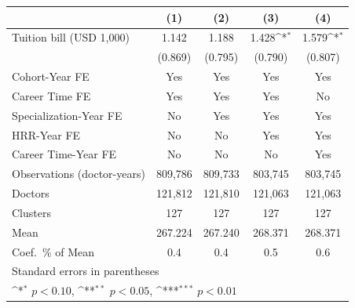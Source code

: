 {
\def\sym#1{\ifmmode^{#1}\else\(^{#1}\)\fi}
\begin{tabular}{l*{4}{c}}
\hline\hline
                    &\multicolumn{1}{c}{(1)}         &\multicolumn{1}{c}{(2)}         &\multicolumn{1}{c}{(3)}         &\multicolumn{1}{c}{(4)}         \\
\hline
Tuition bill (USD 1,000)&       1.142         &       1.188         &       1.428\sym{*}  &       1.579\sym{*}  \\
                    &     (0.869)         &     (0.795)         &     (0.790)         &     (0.807)         \\
[1em]
Cohort-Year FE      &         Yes         &         Yes         &         Yes         &         Yes         \\
[1em]
Career Time FE      &         Yes         &         Yes         &         Yes         &          No         \\
[1em]
Specialization-Year FE&          No         &         Yes         &         Yes         &         Yes         \\
[1em]
HRR-Year FE         &          No         &          No         &         Yes         &         Yes         \\
[1em]
Career Time-Year FE &          No         &          No         &          No         &         Yes         \\
\hline
Observations (doctor-years)&     809,786         &     809,733         &     803,745         &     803,745         \\
Doctors             &     121,812         &     121,810         &     121,063         &     121,063         \\
Clusters            &         127         &         127         &         127         &         127         \\
Mean                &     267.224         &     267.240         &     268.371         &     268.371         \\
Coef.\ \% of Mean   &         0.4         &         0.4         &         0.5         &         0.6         \\
\hline\hline
\multicolumn{5}{l}{\footnotesize Standard errors in parentheses}\\
\multicolumn{5}{l}{\footnotesize \sym{*} \(p<0.10\), \sym{**} \(p<0.05\), \sym{***} \(p<0.01\)}\\
\end{tabular}
}

